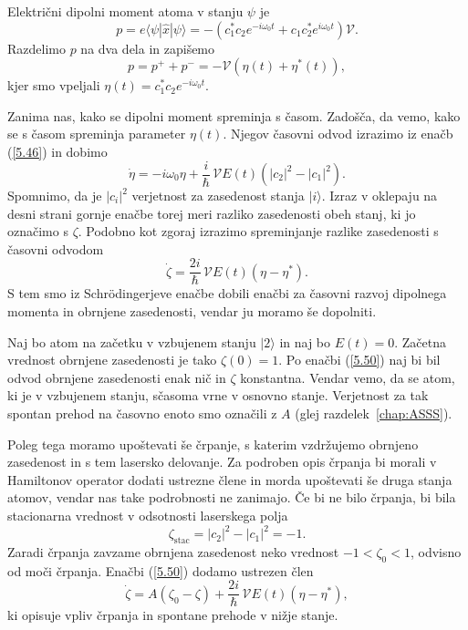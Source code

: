 Električni dipolni moment atoma v stanju ${\psi}$ je 
\begin{equation}  
\label{5.47}
p=e\langle\psi|\hat{x}|\psi\rangle=-
(c_1^{\ast}c_2e^{-i \omega_0t}+c_1c_2^{\ast}e^{i \omega_0 t}) \mathcal{V}.
\end{equation}
Razdelimo $p$ na dva dela in zapišemo
\begin{equation}  
\label{5.48}
p=p^+ + p^-=-\mathcal{V}\left(\eta(t)+\eta^{\ast}(t)\right),
\end{equation}
kjer smo vpeljali $\eta(t)=c_1^{\ast}c_2e^{-i \omega_0 t}$.

Zanima nas, kako se dipolni moment spreminja s časom. Zadošča, da vemo, kako se 
s časom spreminja parameter $\eta(t)$. Njegov časovni odvod izrazimo
iz enačb (\ref{5.46}) in dobimo
\begin{equation}  
\label{5.49}
\dot{\eta}=- i \omega_0\eta+\frac{i}{\hbar}\,\mathcal{V}E(t) \left(|c_2|^2-|c_1|^2\right).
\end{equation}
Spomnimo, da je $|c_i|^2$ verjetnost za zasedenost stanja $|i\rangle$. Izraz v oklepaju
na desni strani gornje enačbe torej meri razliko zasedenosti obeh stanj, ki jo označimo
s $\zeta$. Podobno kot zgoraj izrazimo spreminjanje razlike zasedenosti s časovni odvodom 
\begin{equation}  
\label{5.50}
\dot{\zeta}=\frac{2i}{\hbar}\, \mathcal{V} E(t)\left(\eta- \eta^{\ast}\right).
\end{equation}
S tem smo iz Schr\"odingerjeve enačbe dobili enačbi za časovni razvoj
dipolnega momenta in obrnjene zasedenosti, vendar ju moramo še dopolniti.

Naj bo atom na začetku v vzbujenem stanju $|2\rangle$ in naj bo $E(t)=0$. Začetna
vrednost obrnjene zasedenosti je tako $\zeta(0)=1$. Po enačbi (\ref{5.50}) naj bi 
bil odvod obrnjene zasedenosti enak nič in $\zeta$ konstantna. 
Vendar vemo, da se atom, ki je v vzbujenem stanju, sčasoma vrne v
osnovno stanje. Verjetnost za tak spontan prehod na časovno enoto smo označili z $A$ (glej 
razdelek~\ref{chap:ASSS}).

Poleg tega moramo upoštevati še črpanje, s katerim
vzdržujemo obrnjeno zasedenost in s tem lasersko delovanje. Za podroben
opis črpanja bi morali v Hamiltonov operator dodati ustrezne člene in
morda upoštevati še druga stanja atomov, vendar nas take podrobnosti 
ne zanimajo. Če bi ne bilo črpanja, bi bila stacionarna vrednost
v odsotnosti laserskega polja
\begin{equation}
 \zeta_{\mathrm{stac}}= |c_2|^2-|c_1|^2 = -1.
\end{equation}
Zaradi črpanja zavzame obrnjena zasedenost neko vrednost $-1<\zeta_0<1$, 
odvisno od moči črpanja. Enačbi (\ref{5.50}) dodamo ustrezen člen
\begin{equation}  
\label{5.51}
\dot{\zeta}=A\left(\zeta_0-\zeta\right)+\frac{2i}{\hbar}\,\mathcal{V}E(t)\left(\eta-\eta^{\ast}\right),
\end{equation}
ki opisuje vpliv črpanja in spontane prehode v nižje stanje. 

